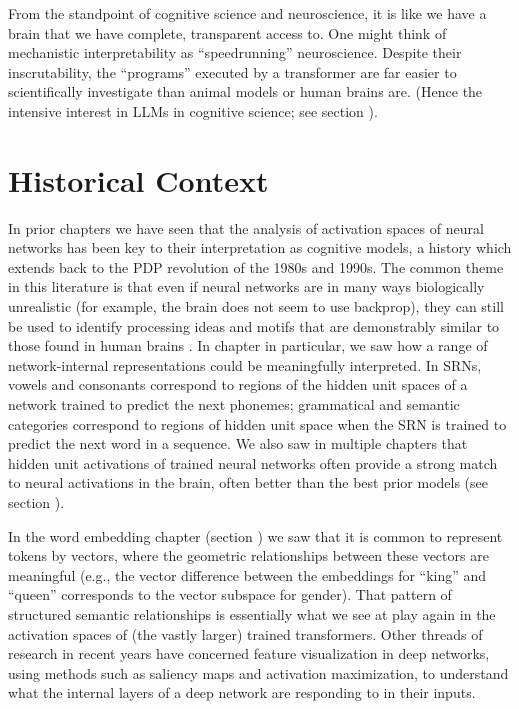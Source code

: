 From the standpoint of cognitive science and neuroscience, it is like we have a
brain that we have complete, transparent access to. One might think of
mechanistic interpretability as ``speedrunning'' neuroscience. Despite their
inscrutability, the ``programs'' executed by a transformer are far easier to
scientifically investigate than animal models or human brains are. (Hence the
intensive interest in LLMs in cognitive science; see section
).


\section{Historical Context}\label{mechInterpHist}

In prior chapters we have seen that the analysis of activation spaces of neural
networks has been key to their interpretation as cognitive models, a history
which extends back to the PDP revolution of the 1980s and 1990s. The common
theme in this literature is that even if neural networks are in many ways
biologically unrealistic (for example, the brain does not seem to use
backprop), they can still be used to identify processing ideas and motifs that
are demonstrably similar to those found in human brains
\cite{zipser1992identification}. In chapter  in
particular, we saw how a range of network-internal representations could be
meaningfully interpreted. In SRNs, vowels and consonants correspond to regions
of the hidden unit spaces of a network trained to predict the next phonemes;
grammatical and semantic categories correspond to regions of hidden unit space
when the SRN is trained to predict the next word in a sequence. We also saw in
multiple chapters that hidden unit activations of trained neural networks often
provide a strong match to neural activations in the brain, often better than
the best prior models (see section ).

In the word embedding chapter (section ) we saw
that it is common to represent tokens by vectors, where the geometric
relationships between these vectors are meaningful (e.g., the vector difference
between the embeddings for ``king'' and ``queen'' corresponds to the vector
subspace for gender). That pattern of structured semantic relationships is
essentially what we see at play again in the activation spaces of (the vastly
larger) trained transformers. Other threads of research in recent years have
concerned feature visualization in deep networks, using methods such as
saliency maps and activation maximization, to understand what the internal
layers of a deep network are responding to in their inputs.

